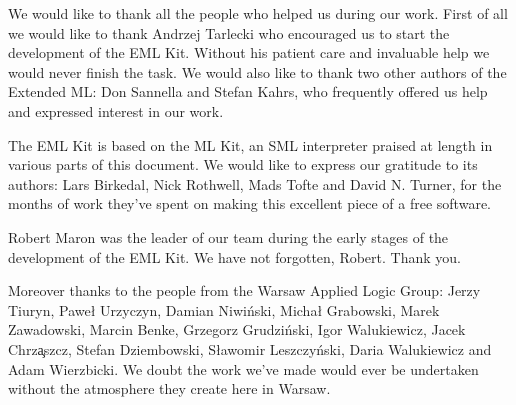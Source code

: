 We would like to thank all the people who helped us during our work.
First of all we would like to thank Andrzej Tarlecki who encouraged us
to start the development of the EML Kit. Without his patient care
and invaluable help we would never finish the task.
We would also like to thank two other authors of the Extended ML:
Don Sannella and Stefan Kahrs, who frequently offered us help and
expressed interest in our work.
 
The EML Kit is based on the ML Kit, an SML interpreter
praised at length in various parts of this document.
We would like to express our gratitude to its authors:
Lars Birkedal, Nick Rothwell, Mads Tofte and David N. Turner, 
for the months of work they've spent on making this
excellent piece of a free software.

Robert Maron was the leader of our team during the early
stages of the development of the EML Kit. We have not 
forgotten, Robert. Thank you.

Moreover thanks to the people from the Warsaw Applied Logic Group:
Jerzy Tiuryn, Pawe{\l} Urzyczyn, Damian Niwi\'nski, Micha{\l} Grabowski,
Marek Zawadowski, Marcin Benke, Grzegorz Grudzi\'nski, Igor Walukiewicz, 
Jacek Chrz\c{a}szcz, Stefan Dziembowski, S{\l}awomir Leszczy\'nski, 
Daria Walukiewicz and Adam Wierzbicki.
We doubt the work we've made would ever be undertaken
without the atmosphere they create here in Warsaw.






